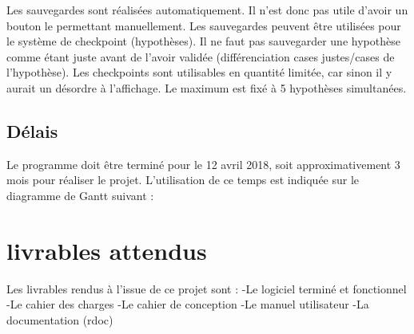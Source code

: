 \documentclass{report}
\begin{document}
		Les sauvegardes sont réalisées automatiquement. Il n'est donc pas utile d'avoir un bouton le permettant manuellement. Les sauvegardes peuvent être utilisées pour le système de checkpoint (hypothèses). Il ne faut pas sauvegarder une hypothèse comme étant juste avant de l'avoir validée (différenciation cases justes/cases de l'hypothèse). Les checkpoints sont utilisables en quantité limitée, car sinon il y aurait un désordre à l'affichage. Le maximum est fixé à 5 hypothèses simultanées.
	
	\section{Délais}
		Le programme doit être terminé pour le 12 avril 2018, soit approximativement 3 mois pour réaliser le projet. L'utilisation de ce temps est indiquée sur le diagramme de Gantt suivant :
		
		
		
\chapter{livrables attendus}
	Les livrables rendus à l'issue de ce projet sont :
		-Le logiciel terminé et fonctionnel
		-Le cahier des charges
		-Le cahier de conception
		-Le manuel utilisateur
		-La documentation (rdoc)
		
		
		
\end{document}
